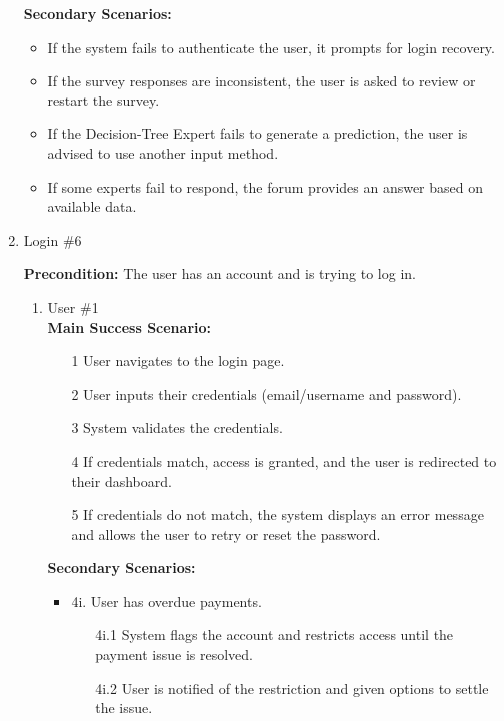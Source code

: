 \documentclass[]{article}
\begin{document}
\begin{enumerate}[{\bf BE1.}]
\textbf{Secondary Scenarios:}
\begin{itemize}
    \item If the system fails to authenticate the user, it prompts for login recovery.
    \item If the survey responses are inconsistent, the user is asked to review or restart the survey.
    \item If the Decision-Tree Expert fails to generate a prediction, the user is advised to use another input method.
    \item If some experts fail to respond, the forum provides an answer based on available data.
\end{itemize}
 
 
\item Login \#6

\textbf{Precondition:} The user has an account and is trying to log in.

\begin{enumerate}[{\bf VP1.}]
    \item User \#1 \\

        \textbf{Main Success Scenario:}
        \begin{enumerate}
            \item[1] User navigates to the login page.
            \item[2] User inputs their credentials (email/username and password).
            \item[3] System validates the credentials.
            \item[4] If credentials match, access is granted, and the user is redirected to their dashboard.
            \item[5] If credentials do not match, the system displays an error message and allows the user to retry or reset the password.
        \end{enumerate}

        \textbf{Secondary Scenarios:}
        \begin{itemize}
            \item 4i. User has overdue payments.
            \begin{enumerate}
                \item[4i.1] System flags the account and restricts access until the payment issue is resolved.
                \item[4i.2] User is notified of the restriction and given options to settle the issue.
            \end{enumerate}
        \end{itemize}
    

\end{enumerate}
\end{enumerate}
\end{document}
